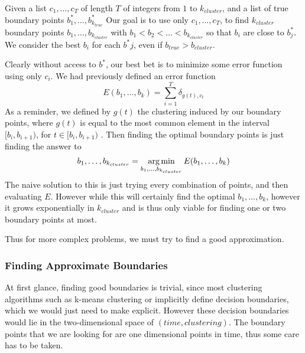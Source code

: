 Given a list $c_1,\ldots,c_{T}$ of length $T$  of integers from $1$ to $k_{cluster}$, and a list of true boundary points $b^*_1,\ldots, b^*_{k_{true}}$ Our goal is to use only $c_1,\ldots, c_{T}$, to find $k_{cluster}$ boundary points $b_1,\ldots,b_{k_{cluster}}$ with $b_1 < b_2 < \ldots <b_{k_{cluster}}$ so that $b_i$ are close to $b^*_j$. We consider the best $b_i$ for each $b^*{j}$, even if $b_{true}>b_{cluster}$. 

Clearly without access to $b^*$, our best bet is to minimize some error function using only $c_i$. We had previously defined an error function 
\[
E(b_1,\ldots,b_k)=\sum_{i=1}^T \delta_{g(t),c_t}
\]
As a reminder, we defined by $g(t)$ the clustering induced by our boundary points, where $g(t)$ is equal to the most common element in the interval $[b_{i},b_{i+1})$, for $t \in [b_i,b_{i+1})$ . Then finding the optimal boundary points is just finding the answer to
\[
b_1,\ldots,b_{k_{cluster}}=\operatorname*{arg\,min}_{b_1,\ldots,b_{k_{cluster}}} E(b_1,\ldots,b_k) 
\]
The naive solution to this is just trying every combination of points, and then evaluating $E$. However while this will certainly find the optimal $b_1,\ldots,b_k$, however it grows exponentially in $k_{cluster}$ and is thus only viable for finding one or two boundary points at most.

Thus for more complex problems, we must try to find a good approximation. 
\subsubsection{Finding Approximate Boundaries}
At first glance, finding good boundaries is trivial, since most clustering algorithms such as k-means clustering or  implicitly define decision boundaries, which we would just need to make explicit. However these decision boundaries would lie  in the two-dimensional space of $(time,clustering)$. The boundary points that we are looking for are one dimensional points in time, thus some care has to be taken. 

